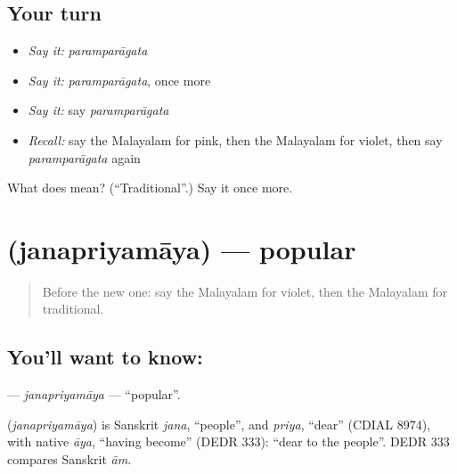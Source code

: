 \subsection*{Your turn}
\begin{itemize}
\raggedright
  \item \emph{Say it:} \emph{paramparāgata}
  \item \emph{Say it:} \emph{paramparāgata}, once more
  \item \emph{Say it:} say \emph{paramparāgata}
  \item \emph{Recall:} say the Malayalam for pink, then the Malayalam for violet, then say \emph{paramparāgata} again
\end{itemize}

\begin{tcolorbox}[breakable,colback=teal!4,colframe=teal!35!black,title={Before you move on}]
What does  mean? (\textquotedblleft{}Traditional\textquotedblright{}.) Say it once more.
\end{tcolorbox}
\section[\texorpdfstring{\ml{ജനപ്രിയമായ} (janapriyamāya)}{ജനപ്രിയമായ (janapriyamāya)}]{ (janapriyamāya) — popular}

\label{lesson:ML-C246-janapriyamaya}



\begin{quote}
Before the new one: say the Malayalam for violet, then the Malayalam for traditional.
\end{quote}

\subsection*{You'll want to know: }
\textbf{} — \emph{janapriyamāya} — \textquotedblleft{}popular\textquotedblright{}.

\begin{cousinweb}
\textbf{} (\emph{janapriyamāya}) is Sanskrit \emph{jana}, \textquotedblleft{}people\textquotedblright{}, and \emph{priya}, \textquotedblleft{}dear\textquotedblright{} (CDIAL 8974), with native \emph{āya}, \textquotedblleft{}having become\textquotedblright{} (DEDR 333): \textquotedblleft{}dear to the people\textquotedblright{}. DEDR 333 compares Sanskrit \emph{ām}.
\end{cousinweb}

